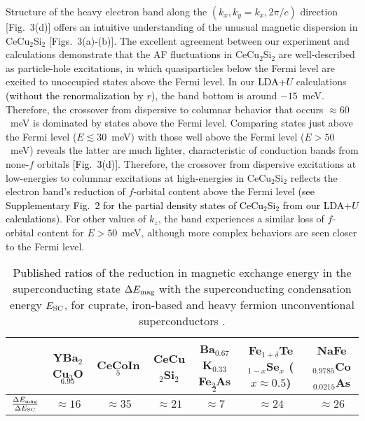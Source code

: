\documentclass[aps,prl,onecolumn,amsmath,amssymb,superscriptaddress]{revtex4}
\newcommand{\ys}{\textcolor{black}}
\newcommand{\yy}{\textcolor{black}}
\begin{document}
Structure of the heavy electron band along the $(k_x,k_y=k_x,2\pi/c)$ direction [Fig.~3(d)] offers an intuitive understanding of the unusual magnetic dispersion in CeCu$_2$Si$_2$ [Figs.~3(a)-(b)]. The excellent agreement between our experiment and calculations demonstrate that the AF fluctuations in CeCu$_2$Si$_2$ are well-described as particle-hole excitations, in which quasiparticles below the Fermi level are excited to unoccupied states above the Fermi level. In our \ys{LDA+$U$} calculations \ys{(without the renormalization by $r$)}, the band bottom is around $-15$~meV. Therefore, the crossover from dispersive to columnar behavior that occurs $\approx60$~meV is dominated by states above the Fermi level. Comparing states just above the Fermi level ($E\lesssim30$~meV) with those well above the Fermi level ($E>50$~meV) reveals the latter are much lighter, characteristic of conduction bands from none-$f$ orbitals \ys{[Fig.~3(d)]}. Therefore, the crossover from dispersive excitations at low-energies to columnar excitations at high-energies in CeCu$_2$Si$_2$ reflects the electron band's reduction of $f$-orbital content above the Fermi level \yy{(see Supplementary Fig.~2 for the partial density states of CeCu$_2$Si$_2$ from our LDA+$U$ calculations)}. For other values of $k_z$, the band experiences a similar loss of $f$-orbital content for $E>50$~meV, although more complex behaviors are seen closer to the Fermi level. 

\begin{table*}
	\caption{\ys{Published ratios} of the reduction in magnetic exchange energy in the superconducting state $\Delta E_{\rm mag}$ with the superconducting condensation energy $E_{\rm SC}$, for cuprate, iron-based and heavy fermion unconventional superconductors \cite{HWoo2006,CStock2008,OStockert2011,MWang2013,JLeiner2014,SCarr2016}.}
	\begin{ruledtabular}
		\begin{tabular}{ccccccc}
			&YBa$_2$Cu$_3$O$_{6.95}$ &CeCoIn$_5$ &CeCu$_2$Si$_2$ &Ba$_{0.67}$K$_{0.33}$Fe$_2$As$_2$ &Fe$_{1+\delta}$Te$_{1-x}$Se$_x$ ($x\approx0.5$) & NaFe$_{0.9785}$Co$_{0.0215}$As\\
			\hline
			$\frac{\Delta E_{\rm mag}}{\Delta E_{\rm SC}}$&$\approx16$&$\approx35$&$\approx21$&$\approx7$ &$\approx24$&$\approx26$\\
			
		\end{tabular}
	\end{ruledtabular}
	
\end{table*}
\end{document}
